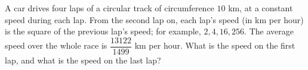A car drives four laps of a circular track of circumference $10$ km, at a constant speed during each lap. From the second lap on, each lap's speed (in km per hour) is the square of the previous lap's speed; for example, $2,4,16,256$. The average speed over the whole race is $\dfrac{13122}{1499}$ km per hour. What is the speed on the first lap, and what is the speed on the last lap?
